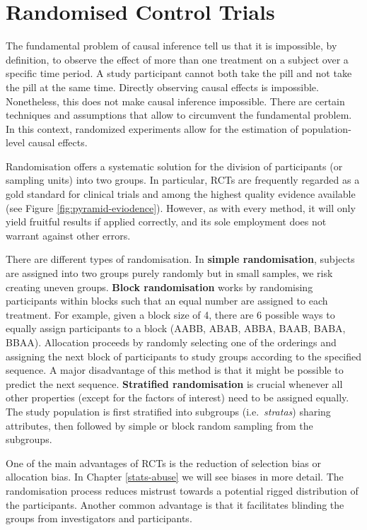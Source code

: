 \documentclass[
]{book}
\begin{document}
\hypertarget{randomised-control-trials}{%
\section{Randomised Control Trials}\label{randomised-control-trials}}

The fundamental problem of causal inference tell us that it is impossible, by definition, to observe the effect of more than one treatment on a subject over a specific time period. A study participant cannot both take the pill and not take the pill at the same time. Directly observing causal effects is impossible. Nonetheless, this does not make causal inference impossible. There are certain techniques and assumptions that allow to circumvent the fundamental problem. In this context, randomized experiments allow for the estimation of population-level causal effects.

Randomisation offers a systematic solution for the division of participants (or sampling units) into two groups. In particular, RCTs are frequently regarded as a gold standard for clinical trials and among the highest quality evidence available (see Figure \ref{fig:pyramid-eviodence}). However, as with every method, it will only yield fruitful results if applied correctly, and its sole employment does not warrant against other errors.

There are different types of randomisation. In \textbf{simple randomisation}, subjects are assigned into two groups purely randomly but in small samples, we risk creating uneven groups. \textbf{Block randomisation} works by randomising participants within blocks such that an equal number are assigned to each treatment. For example, given a block size of 4, there are 6 possible ways to equally assign participants to a block (AABB, ABAB, ABBA, BAAB, BABA, BBAA). Allocation proceeds by randomly selecting one of the orderings and assigning the next block of participants to study groups according to the specified sequence. A major disadvantage of this method is that it might be possible to predict the next sequence. \textbf{Stratified randomisation} is crucial whenever all other properties (except for the factors of interest) need to be assigned equally. The study population is first stratified into subgroups (i.e.~\emph{stratas}) sharing attributes, then followed by simple or block random sampling from the subgroups.

One of the main advantages of RCTs is the reduction of selection bias or allocation bias. In Chapter \ref{stats-abuse} we will see biases in more detail. The randomisation process reduces mistrust towards a potential rigged distribution of the participants. Another common advantage is that it facilitates blinding the groups from investigators and participants.
\end{document}
